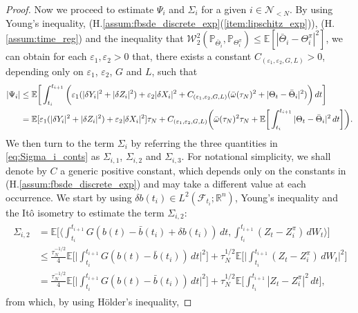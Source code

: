 \documentclass[11pt]{article}
\numberwithin{equation}{section}
\theoremstyle{definition}
\theoremstyle{remark}
\def\l{\label}  \def\f{\frac}  \def\fa{\forall}
\def\eps{\varepsilon}
\def \la{\langle} \def\ra{\rangle}
\def\cF{\mathcal{F}}
\def\cN{\mathcal{N}}
\def\cW{\mathcal{W}}
\def\sE{{\mathbb{E}}}
\def\sP{\mathbb{P}}
\def\sR{{\mathbb R}}
\begin{document}
\begin{proof}
Now we proceed to estimate $\Psi_i$ and $\Sigma_i$ for a given $i\in \cN_{<N}$. 
By using Young's inequality,
(H.\ref{assum:fbsde_discrete_exp}(\ref{item:lipschitz_exp})),
(H.\ref{assum:time_reg})  
and 
the inequality that $\cW^2_2(\sP_{\bar{\Theta}_i},\sP_{{\Theta^\pi_i}})\le \sE[|\bar{\Theta}_i-{\Theta^\pi_i}|^2]$,
we can obtain for each $\eps_1,\eps_2>0$ that, 
there exists a constant $C_{(\eps_1,\eps_2,G,L)}>0$, depending only on $\eps_1$, $\eps_2$, $G$ and $L$,
such that 
\begin{align}\l{eq:Psi_i_conts}
\begin{split}
|{\Psi_i}|
&\le 
\sE\bigg[ \int_{t_i}^{t_{i+1}}
\bigg(
\eps_1(|\delta Y_{i}|^2+|\delta Z_{i}|^2)
+
\eps_2|\delta X_{i}|^2
+
C_{(\eps_1,\eps_2,G,L)}(\bar{\om}(\tau_N)^2+
|\Theta_t-\bar{\Theta}_i|^2)
\bigg) \,dt\bigg]
\\
&= 
\sE[
\eps_1(|\delta Y_{i}|^2+|\delta Z_{i}|^2)
+\eps_2|\delta X_{i}|^2
]\tau_N
+
C_{(\eps_1,\eps_2,G,L)}\bigg(
\bar{\om}(\tau_N)^2\tau_N+
\sE
\bigg[
 \int_{t_i}^{t_{i+1}}
|\Theta_t-\bar{\Theta}_i|^2
 \,dt
 \bigg]\bigg).
\end{split}
\end{align}
We then turn to the term $\Sigma_i$ by referring the three quantities in \eqref{eq:Sigma_i_conts} as $\Sigma_{i,1}$,
$\Sigma_{i,2}$ and $\Sigma_{i,3}$. 
For notational simplicity, we shall denote by $C$  a generic  positive constant, 
which depends only on the constants   in (H.\ref{assum:fbsde_discrete_exp})
and  may take a different value at each occurrence.
We start by using
$\delta {b}(t_{i})\in L^2(\cF_{t_i};\sR^n)$,
Young's inequality 
and the It\^{o} isometry  
to estimate the term $\Sigma_{i,2}$:
\begin{align*}%
\begin{split}
\Sigma_{i,2}
&= 
\sE\bigg[
\bigg\la 
\int_{t_i}^{t_{i+1}}G(b(t)-\bar{b}(t_i)+\delta {b}(t_{i}))\,dt,\int_{t_i}^{t_{i+1}} ({Z}_t-Z^\pi_i)\,d W_t
\bigg\ra
\bigg]
\\
&\le
\frac{\tau_N^{-1/2}}{4}
\sE\bigg[\bigg| 
\int_{t_i}^{t_{i+1}}G(b(t)-\bar{b}(t_i))\,dt
\bigg|^2\bigg]
+{\tau_N^{1/2}}
\sE\bigg[\bigg|
\int_{t_i}^{t_{i+1}} ({Z}_t-Z^\pi_i)\,d W_t
\bigg|^2\bigg]
\\
&=
\frac{\tau_N^{-1/2}}{4}
\sE\bigg[\bigg| 
\int_{t_i}^{t_{i+1}}G(b(t)-\bar{b}(t_i))\,dt
\bigg|^2\bigg]
+{\tau_N^{1/2}}
\sE\bigg[
\int_{t_i}^{t_{i+1}} |{Z}_t-Z^\pi_i|^2\,d t
\bigg],
\end{split}
\end{align*}
from which,  by using  H\"{o}lder's inequality,

\end{proof}
\end{document}
